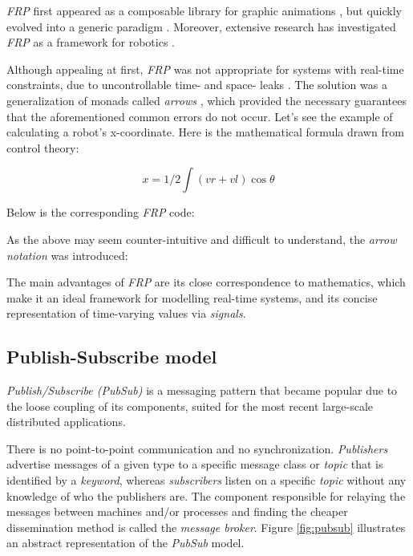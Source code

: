 \documentclass[sigplan,review,anonymous]{acmart}\settopmatter{printfolios=true,printacmref=false}
\begin{document}
\textit{FRP} first appeared as a composable library for graphic animations \cite{fran}, but quickly evolved into a generic paradigm \cite{survey_frp,real_frp,pushpull_frp}. Moreover, extensive research has investigated \textit{FRP} as a framework for robotics \cite{arrows_robots,lambda_in_motion}.

Although appealing at first, \textit{FRP} was not appropriate for systems  with real-time constraints, due to uncontrollable time- and space- leaks \cite{event_frp}. The solution was a generalization of monads called \textit{arrows} \cite{arrows}, which provided the necessary guarantees that the aforementioned common errors do not occur. Let's see the example of calculating a robot's x-coordinate. Here is the mathematical formula drawn from control theory:

$$ x = 1/2 \int (vr + vl) \cos\theta $$

Below is the corresponding \textit{FRP} code:


As the above may seem counter-intuitive and difficult to understand, the \textit{arrow notation}\cite{arrows_notation} was introduced:


The main advantages of \textit{FRP} are its close correspondence to mathematics\cite{survey_frp}, which make it an ideal framework for modelling real-time systems, and its concise representation of time-varying values via \textit{signals}.

\subsection{Publish-Subscribe model}

\textit{Publish/Subscribe (PubSub)} is a messaging pattern that became popular due to the loose coupling of its components, suited for the most recent large-scale distributed applications.

There is no point-to-point communication and no synchronization. \textit{Publishers} advertise messages of a given type to a specific message class or \textit{topic} that is identified by a \textit{keyword}, whereas \textit{subscribers} listen on a specific \textit{topic} without any knowledge of who the publishers are. The component responsible for relaying the messages between machines and/or processes and finding the cheaper dissemination method is called the \textit{message broker}. Figure \ref{fig:pubsub} illustrates an abstract representation of the \textit{PubSub} model.
\end{document}
